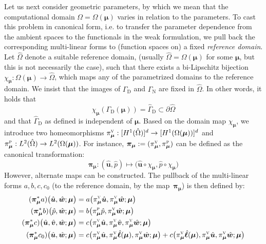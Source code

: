 \documentclass[onecolumn, twoside, a4paper, 11pt]{article}
\begin{document}
Let us next consider geometric parameters, by which we mean that
the computational domain $\Omega = \Omega(\bm \mu)$ varies in relation to the parameters.
To cast this problem in canonical form, i.e. to transfer the parameter dependence
from the ambient spaces to the functionals in the weak formulation, we pull back
the corresponding multi-linear forms to (function spaces on) a fixed \emph{reference domain}.
Let $\hat{\Omega}$ denote a suitable reference domain, (usually
$\hat{\Omega} = \Omega({\bm \mu})$ for some $\bm \mu$, but this is not
necessarily the case), such that there exists a bi-Lipschitz bijection
$\chi_{\bm \mu} : \Omega(\bm \mu) \to\hat{\Omega}$,
which maps any of the parametrized domains to the reference domain. We insist that
the images of $\Gamma_\text{D}$ and $\Gamma_\text{N}$ are fixed in $\hat{\Omega}$.
In other words, it holds that
%
\begin{equation}
  \chi_{\bm \mu}( \Gamma_\text{D}(\bm \mu) ) =
  \hat{\Gamma}_\text{D} \subset \partial \hat{\Omega}
\end{equation}
%
and that $\hat{\Gamma}_\text{D}$ as defined is independent of $\bm
\mu$. Based on the domain map $\chi_{\bm \mu}$, we introduce
two homeomorphisms ${\pi}_{\bm\mu}^\textsc{v}:[H^1(\hat{\Omega})]^d\to{}[H^1(\Omega(\bm \mu))]^d$
and ${\pi}_{\bm\mu}^\textsc{p}:L^2(\hat{\Omega})\to{}L^2(\Omega(\bm{\mu}))$. For instance,
$\bm{\pi}_{\bm\mu}:=({\pi}_{\bm\mu}^\textsc{v},{\pi}_{\bm\mu}^\textsc{p})$ can be defined as the canonical
transformation:
%
\begin{equation}
  \label{eqn:cantrf}
\bm{\pi}_{\bm\mu}:(\hat{\bm{u}},\hat{p})\mapsto\big(\hat{\bm{u}}\circ\chi_{\bm\mu},\hat{p}\circ\chi_{\bm\mu}\big)
\end{equation}
%
However, alternate maps can be constructed. The pullback of the multi-linear forms
$a,b,c,c_0$ (to the reference domain, by the map~$\bm{\pi}_{\bm\mu}$) is then defined by:
%
\begin{equation}
  \label{eqn:newform}
\begin{aligned}
({\bm\pi}^*_{\bm\mu}a)\big(\hat{\bm{u}},\hat{\bm{w}};\bm{\mu}\big)
&=
a\big({\pi}_{\bm\mu}^\textsc{v}\hat{\bm{u}},{\pi}_{\bm\mu}^\textsc{v}\hat{\bm{w}};\bm{\mu}\big)
\\
({\bm\pi}^*_{\bm\mu}b)\big(\hat{p},\hat{\bm{w}};\bm{\mu}\big)
&=
b\big({\pi}_{\bm\mu}^\textsc{p}\hat{p},{\pi}_{\bm\mu}^\textsc{v}\hat{\bm{w}};\bm{\mu}\big)
\\
({\bm\pi}^*_{\bm\mu}c)\big(\hat{\bm{u}},\hat{\bm{v}},\hat{\bm{w}};\bm{\mu}\big)
&=
c\big({\pi}_{\bm\mu}^\textsc{v}\hat{\bm{u}},{\pi}_{\bm\mu}^\textsc{v}\hat{\bm{v}},{\pi}_{\bm\mu}^\textsc{v}\hat{\bm{w}};\bm{\mu}\big)
\\
({\bm\pi}^*_{\bm\mu}c_0)\big(\hat{\bm{u}},\hat{\bm{w}};\bm{\mu}\big)
&=
c\big({\pi}_{\bm\mu}^\textsc{v}\hat{\bm{u}},{\pi}_{\bm\mu}^\textsc{v}\hat{\bm{\ell}}(\bm{\mu}),{\pi}_{\bm\mu}^\textsc{v}\hat{\bm{w}};\bm{\mu}\big)
+
c\big({\pi}_{\bm\mu}^\textsc{v}\hat{\bm{\ell}}(\bm{\mu}),{\pi}_{\bm\mu}^\textsc{v}\hat{\bm{u}},{\pi}_{\bm\mu}^\textsc{v}\hat{\bm{w}};\bm{\mu}\big)
\end{aligned}
\end{equation}
\end{document}
